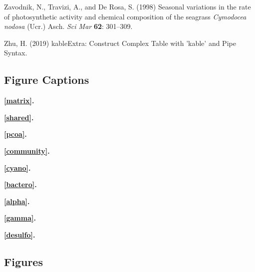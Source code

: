 \documentclass[12pt,]{article}
\begin{document}
\leavevmode\hypertarget{ref-Zavodnik1998}{}%
Zavodnik, N., Travizi, A., and De Rosa, S. (1998) Seasonal variations in
the rate of photosynthetic activity and chemical composition of the
seagrass \emph{Cymodocea nodosa} (Ucr.) Asch. \emph{Sci Mar}
\textbf{62}: 301--309.

\leavevmode\hypertarget{ref-Zhu2019}{}%
Zhu, H. (2019) kableExtra: Construct Complex Table with 'kable' and Pipe
Syntax.

\newpage 
\setlength\parindent{0pt}

\hypertarget{figure-captions}{%
\subsection{Figure Captions}\label{figure-captions}}

\textbf{\autoref{matrix}.} 

\textbf{\autoref{shared}.} 

\textbf{\autoref{pcoa}.} 

\textbf{\autoref{community}.} 

\textbf{\autoref{cyano}.} 

\textbf{\autoref{bactero}.} 

\textbf{\autoref{alpha}.} 

\textbf{\autoref{gamma}.} 

\textbf{\autoref{desulfo}.} 

\hypertarget{figures}{%
\subsection{Figures}\label{figures}}
\end{document}
